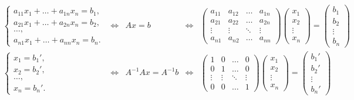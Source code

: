 \documentclass{article}
\begin{document}
\begin{align*}
&\begin{cases}
a_{11} x_1 + \dots + a_{1n} x_n = b_1, \\
a_{21} x_1 + \dots + a_{2n} x_n = b_2, \\
\dots, \\
a_{n1} x_1 + \dots + a_{nn} x_n = b_n.
\end{cases} &\iff& Ax = b &\iff&
\begin{pmatrix}
    a_{11} & a_{12} & \dots & a_{1n} \\
    a_{21} & a_{22} & \dots & a_{2n} \\
    \vdots & \vdots & \ddots & \vdots \\
    a_{n1} & a_{n2} & \dots & a_{nn}
\end{pmatrix} \begin{pmatrix}
    x_1 \\ x_2 \\ \vdots \\ x_n
\end{pmatrix} = \begin{pmatrix}
    b_1 \\ b_2 \\ \vdots \\ b_n
\end{pmatrix}& \\
&\begin{cases}
x_1 = b_1', \\
x_2 = b_2', \\
\dots, \\
x_n = b_n'.
\end{cases} &\iff& A^{-1} A x = A^{-1} b &\iff& \begin{pmatrix}
    1 & 0 & \dots & 0 \\
    0 & 1 & \dots & 0 \\
    \vdots & \vdots & \ddots & \vdots \\
    0 & 0 & \dots & 1
\end{pmatrix} \begin{pmatrix}
    x_1 \\ x_2 \\ \vdots \\ x_n
\end{pmatrix} = \begin{pmatrix}
    b_1' \\ b_2' \\ \vdots \\ b_n'
\end{pmatrix}&
\end{align*}
\end{document}
